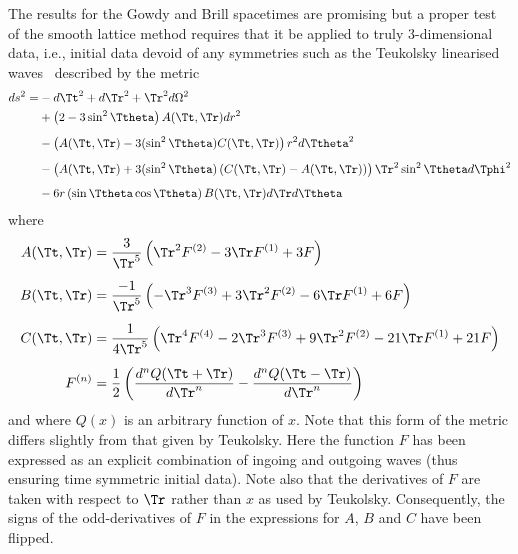 \documentclass[a4paper,12pt]{article}
\numberwithin{equation}{section}
\begin{document}
The results for the Gowdy and Brill spacetimes are promising but a proper test of the smooth
lattice method requires that it be applied to truly 3-dimensional data, i.e., initial data
devoid of any symmetries such as the Teukolsky linearised waves~\cite{teukolsky:1982-01}
described by the metric
\begin{align}
   \label{eqn:TeukPolarMetric}
   \begin{split}
      ds^2
      =& -d\Tt^2 +d\Tr^2 + \Tr^2d\Omega^2\\
       &  + \left(2-3\sin^2\Ttheta\right)A(\Tt,\Tr)dr^2\\[5pt]
       &  - \left( A(\Tt,\Tr) - 3(\sin^2\Ttheta)C(\Tt,\Tr) \right)r^2 d\Ttheta^2\\[5pt]
       &  - \left( A(\Tt,\Tr) + 3(\sin^2\Ttheta)\left(C(\Tt,\Tr)-A(\Tt,\Tr)\right)
            \right)\Tr^2\sin^2\Ttheta d\Tphi^2\\[5pt]
       &  - 6r\left(\sin\Ttheta\cos\Ttheta\right)B(\Tt,\Tr) d\Tr d\Ttheta
   \end{split}
\end{align}
where
\begin{align}
   \label{eqn:funA}
      A(\Tt,\Tr) &= \frac{3}{\Tr^5} \left(  \Tr^2F^{(2)}
                                          -3\Tr F^{(1)}
                                          +3F\right)\\[5pt]
   \label{eqn:funB}
      B(\Tt,\Tr) &= \frac{-1}{\Tr^5}\left( -\Tr^3F^{(3)}
                                          +3\Tr^2F^{(2)}
                                          -6\Tr F^{(1)}
                                          +6F\right)\\[5pt]
   \label{eqn:funC}
      C(\Tt,\Tr) &= \frac{1}{4\Tr^5}\left(   \Tr^4F^{(4)}
                                           -2\Tr^3F^{(3)}
                                           +9\Tr^2F^{(2)}
                                          -21\Tr F^{(1)}
                                          +21F\right)\\[5pt]
   \label{eqn:funF}
      F^{(n)}&= \frac{1}{2} \left( \frac{d^nQ(\Tt+\Tr)}{d\Tr^n}
                                  -\frac{d^nQ(\Tt-\Tr)}{d\Tr^n}\right)
\end{align}
and where $Q(x)$ is an arbitrary function of $x$. Note that this form of the metric differs
slightly from that given by Teukolsky. Here the function $F$ has been expressed as an
explicit combination of ingoing and outgoing waves (thus ensuring time symmetric initial
data). Note also that the derivatives of $F$ are taken with respect to $\Tr$ rather than $x$
as used by Teukolsky. Consequently, the signs of the odd-derivatives of $F$ in the
expressions for $A$, $B$ and $C$ have been flipped.
\end{document}
